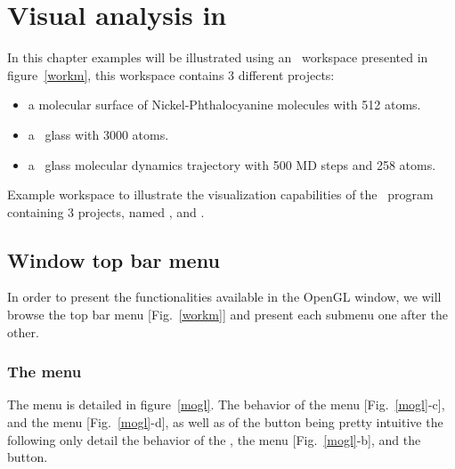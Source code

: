 \chapter{Visual analysis in \atomes}
\label{visual}

In this chapter examples will be illustrated using an \atomes\ workspace presented in figure~\ref{workm}, this workspace contains 3 different projects:
\begin{itemize}
\item a molecular surface of Nickel-Phthalocyanine molecules with 512 atoms.
\item a \sio\ glass with 3000 atoms. 
\item a \ges\ glass molecular dynamics trajectory with 500 MD steps and 258 atoms.
\end{itemize}
{Example workspace to illustrate the visualization capabilities of the \atomes\ program containing 3 projects, named \mbox{},  and .}

\section{Window top bar menu}

In order to present the functionalities available in the OpenGL window, we will browse the top bar menu [Fig.~\ref{workm}] and present each submenu one after the other. \\

\subsection{The  menu}

\moglfig

The  menu is detailed in figure~\ref{mogl}. The behavior of the  menu [Fig.~\ref{mogl}-c], and the  menu [Fig.~\ref{mogl}-d], 
as well as of the  button being pretty intuitive the following only detail the behavior of the , 
the  menu [Fig.~\ref{mogl}-b], and the  button.

